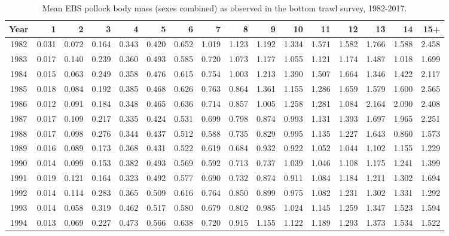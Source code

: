 \documentclass[]{article}
\begin{document}
\begin{table}[ht]
\centering
\caption{ Mean EBS pollock body mass (sexes combined) as observed in the bottom trawl survey, 1982-2017.}
\footnotesize
\label{tab:BTS_wtage}
\begin{tabular}{crrrrrrrrrrrrrrr}
\hline
\normalsize  Year & 1 & 2 & 3 & 4 & 5 & 6 & 7 & 8 & 9 & 10 & 11 & 12 & 13 & 14 & 15+  \\
\hline
1982 & 0.031 & 0.072 & 0.164 & 0.343 & 0.420 & 0.652 & 1.019 & 1.123 & 1.192 & 1.334 & 1.571 & 1.582 & 1.766 & 1.588 & 2.458 \\
1983 & 0.017 & 0.140 & 0.239 & 0.360 & 0.493 & 0.585 & 0.720 & 1.073 & 1.177 & 1.055 & 1.121 & 1.174 & 1.487 & 1.018 & 1.699 \\
1984 & 0.015 & 0.063 & 0.249 & 0.358 & 0.476 & 0.615 & 0.754 & 1.003 & 1.213 & 1.390 & 1.507 & 1.664 & 1.346 & 1.422 & 2.117 \\
1985 & 0.018 & 0.084 & 0.192 & 0.385 & 0.468 & 0.626 & 0.763 & 0.864 & 1.361 & 1.155 & 1.286 & 1.659 & 1.579 & 1.600 & 2.565 \\
1986 & 0.012 & 0.091 & 0.184 & 0.348 & 0.465 & 0.636 & 0.714 & 0.857 & 1.005 & 1.258 & 1.281 & 1.084 & 2.164 & 2.090 & 2.408 \\
1987 & 0.017 & 0.109 & 0.217 & 0.335 & 0.424 & 0.531 & 0.699 & 0.798 & 0.874 & 0.993 & 1.131 & 1.393 & 1.697 & 1.965 & 2.251 \\
1988 & 0.017 & 0.098 & 0.276 & 0.344 & 0.437 & 0.512 & 0.588 & 0.735 & 0.829 & 0.995 & 1.135 & 1.227 & 1.643 & 0.860 & 1.573 \\
1989 & 0.016 & 0.089 & 0.173 & 0.368 & 0.431 & 0.522 & 0.619 & 0.684 & 0.932 & 0.922 & 1.052 & 1.044 & 1.102 & 1.155 & 1.229 \\
1990 & 0.014 & 0.099 & 0.153 & 0.382 & 0.493 & 0.569 & 0.592 & 0.713 & 0.737 & 1.039 & 1.046 & 1.108 & 1.175 & 1.241 & 1.399 \\
1991 & 0.019 & 0.121 & 0.164 & 0.323 & 0.492 & 0.577 & 0.690 & 0.732 & 0.874 & 0.911 & 1.084 & 1.184 & 1.211 & 1.302 & 1.694 \\
1992 & 0.014 & 0.114 & 0.283 & 0.365 & 0.509 & 0.616 & 0.764 & 0.850 & 0.899 & 0.975 & 1.082 & 1.231 & 1.302 & 1.331 & 1.292 \\
1993 & 0.014 & 0.058 & 0.319 & 0.462 & 0.517 & 0.580 & 0.679 & 0.802 & 0.985 & 1.024 & 1.145 & 1.259 & 1.347 & 1.523 & 1.594 \\
1994 & 0.013 & 0.069 & 0.227 & 0.473 & 0.566 & 0.638 & 0.720 & 0.915 & 1.155 & 1.122 & 1.189 & 1.293 & 1.373 & 1.534 & 1.522 \\

\end{tabular}
\end{table}
\end{document}
